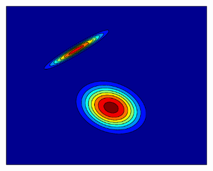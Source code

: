 \documentclass[useAMS,usenatbib,fleqn]{mn2e}
\begin{document}
\begin{figure}
\begin{subfigure}[b]{0.3\columnwidth}
                \includegraphics[width=\textwidth]{figures/GPVC2.eps}
        \end{subfigure}
       

\end{figure}
\end{document}
